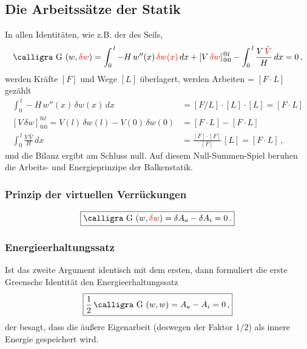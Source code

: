 {{{{%
{\textcolor{sectionTitleBlue}{\section{Die Arbeitss\"{a}tze der Statik}}}
In allen Identit\"{a}ten, wie z.B. der des Seils,
\begin{align}
\text{\normalfont\calligra G\,\,}(w,\textcolor{red}{\delta w}) = \int_0^{\,l} - H\,w''(x)\,\textcolor{red}{\delta w(x)}\,dx + [V\,\textcolor{red}{\delta w}]_{@0}^{@l} - \int_0^{\,l} \frac{V\,\textcolor{red}{\hat{V}}}{H}\,dx = 0\,,
\end{align}
werden Kr\"{a}fte $[F]$\index{[F]} und Wege $[L]$\index{[L]} \"{u}berlagert, werden Arbeiten = $[F \cdot L] $ gez\"{a}hlt
\begin{align}
\int_0^{\,l} - H\,w''(x)\,\delta w(x) \,dx &= [F  / L] \cdot [L] \cdot [L] = [F  \cdot L]\\
[V\,\delta w]_{@0}^{@l} = V(l)\, \delta w(l) - V(0) \,\delta w(0) &= [F  \cdot L] -[F  \cdot L]\\
\int_0^{\,l} \frac{V\,\hat{V}}{H}\,dx &= \frac{[F] \cdot [F]}{[F]}\,[L] = [F  \cdot L]\,,
\end{align}
und die Bilanz ergibt am Schluss null. Auf diesem \glq Null-Summen-Spiel\grq{} beruhen die Arbeits- und Energieprinzipe der Balkenstatik.
\pagebreak
{\textcolor{sectionTitleBlue}{\subsubsection*{Prinzip der virtuellen Verr\"{u}ckungen}}}

\vspace{-0.7cm}
\begin{align}
\boxed{\text{\normalfont\calligra G\,\,}(w, \textcolor{red}{\delta w}) = \delta A_a - \delta A_i = 0\,.}
\end{align}
{\textcolor{sectionTitleBlue}{\subsubsection*{Energieerhaltungssatz}}}

Ist das zweite Argument identisch mit dem ersten, dann formuliert die erste Greensche Identit\"{a}t den Energieerhaltungssatz
\begin{align}
\boxed{\frac{1}{2}\, \text{\normalfont\calligra G\,\,}(w,  w) =  A_a -  A_i = 0\,,}
\end{align}
der besagt, dass die \"{a}u{\ss}ere Eigenarbeit (deswegen der Faktor $1/2 $) als innere Energie gespeichert wird.

}}}}
